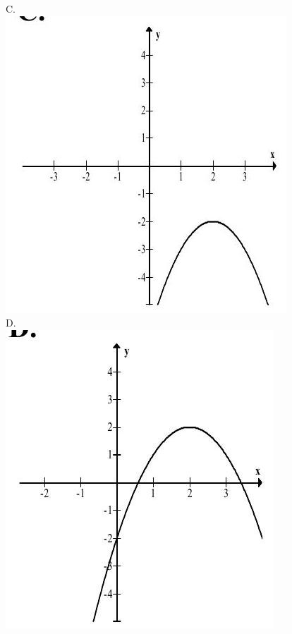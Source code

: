 \documentclass[10pt]{article}
\begin{document}
C.\\
\includegraphics[max width=\textwidth, center]{2024_11_21_6a8be49478f78d0689cfg-04(3)}\\
D.\\
\includegraphics[max width=\textwidth, center]{2024_11_21_6a8be49478f78d0689cfg-04}
\end{document}
